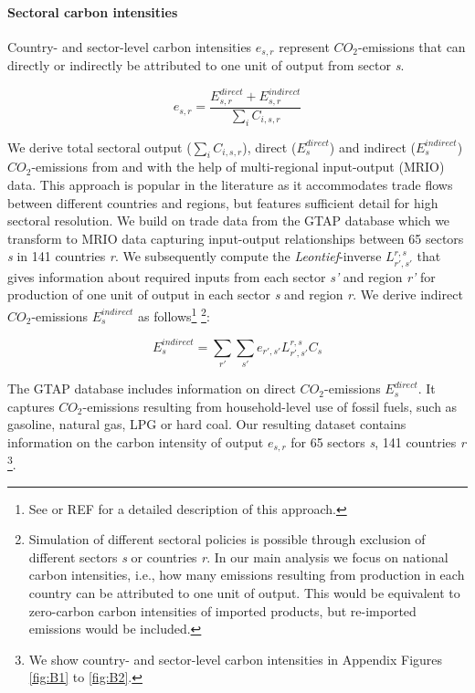 \documentclass[12pt, a4paper]{article}
\begin{document}
\paragraph{Sectoral carbon intensities} Country- and sector-level carbon intensities $e_{s,r}$ represent $CO_{2}$-emissions that can directly or indirectly be attributed to one unit of output from sector \textit{s}.

\begin{equation}
    e_{s,r} = \frac{E_{s,r}^{direct}+E_{s,r}^{indirect}}{\sum_{i} C_{i,s,r}}
\end{equation}

We derive total sectoral output ($\sum_{i} C_{i,s,r}$), direct ($E_{s}^{direct}$) and indirect ($E_{s}^{indirect}$) $CO_{2}$-emissions from and with the help of multi-regional input-output (MRIO) data. This approach is popular in the literature as it accommodates trade flows between different countries and regions, but features sufficient detail for high sectoral resolution. We build on trade data from the GTAP database \autocite{Aguiar.2019} which we transform to MRIO data \autocite{Peters.2011} capturing input-output relationships between 65 sectors \textit{s} in 141 countries \textit{r}. We subsequently compute the \textit{Leontief}-inverse $L_{r',s'}^{r,s}$ that gives information about required inputs from each sector \textit{s'} and region \textit{r'} for production of one unit of output in each sector \textit{s} and region \textit{r}. We derive indirect $CO_{2}$-emissions $E_{s}^{indirect}$ as follows\footnote{See \autocite{Missbach.2023b, Steckel.2021b,Feindt.2021,VogtSchilb.2019} or REF for a detailed description of this approach.} \footnote{Simulation of different sectoral policies is possible through exclusion of different sectors \textit{s} or countries \textit{r}. In our main analysis we focus on national carbon intensities, i.e., how many emissions resulting from production in each country can be attributed to one unit of output. This would be equivalent to zero-carbon carbon intensities of imported products, but re-imported emissions would be included.}:

\begin{equation}
    E_{s}^{indirect} = \sum_{r'} \sum_{s'} e_{r',s'} L_{r',s'}^{r,s} C_{s}
\end{equation}

The GTAP database includes information on direct $CO_{2}$-emissions $E_{s}^{direct}$. It captures $CO_{2}$-emissions resulting from household-level use of fossil fuels, such as gasoline, natural gas, LPG or hard coal.
Our resulting dataset contains information on the carbon intensity of output $e_{s,r}$ for 65 sectors \textit{s}, 141 countries \textit{r} \footnote{We show country- and sector-level carbon intensities in Appendix Figures \ref{fig:B1} to \ref{fig:B2}.}.
\end{document}
